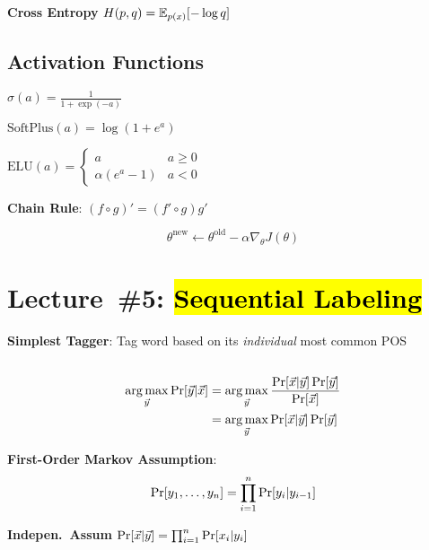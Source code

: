 \documentclass[8pt]{extarticle}
\renewcommand{\green}[1]{{\color{ForestGreen} #1}}
\newcommand{\greenbf}[1]{\textbf{\green{#1}}}
\begin{document}
\begin{multicols}{3}
  \greenbf{Cross Entropy} $H(p,q) = \mathbb{E}_{p(x)} \lbrack-\log q\rbrack$

  \subsection*{Activation Functions}

  $\sigma(a) = \frac{1}{1+\exp(-a)}$

  $\text{SoftPlus}(a) = \log(1 + e^{a})$

  $\text{ELU}(a) = \begin{cases}
                      a & a \geq 0 \\
                      \alpha (e^{a} - 1) & a < 0
                   \end{cases}$

  \greenbf{Chain Rule}: $(f \circ g)' = (f' \circ g)g'$

  \begin{equation*}
    \theta^{\text{new}} \gets \theta^{\text{old}} - \alpha \nabla_{\theta}J(\theta)
  \end{equation*}

  \section*{Lecture~\#5: \hl{Sequential Labeling}}

  \textbf{Simplest Tagger}: Tag word based on its \textit{individual} most common POS

  \subsection*{}

  \begin{align*}
    \operatorname*{arg\,max}_{\vec{y}} \Pr\lbrack\vec{y} \vert \vec{x}\rbrack &= \operatorname*{arg\,max}_{\vec{y}} \frac{\Pr\lbrack\vec{x} \vert \vec{y}\rbrack\Pr[\vec{y}]}{\Pr[\vec{x}]} \\
                                                        &= \operatorname*{arg\,max}_{\vec{y}} \Pr\lbrack\vec{x} \vert \vec{y}\rbrack \Pr[\vec{y}]
  \end{align*}

  \greenbf{First-Order Markov Assumption}:
  \begin{equation*}
    \Pr\lbrack y_{1},\ldots,y_{n}\rbrack = \prod_{i=1}^{n} \Pr[y_{i} \vert y_{i-1}]
  \end{equation*}

  \greenbf{Indepen.\ Assum} $\Pr\lbrack\vec{x} \vert \vec{y}\rbrack = \prod_{i=1}^{n} \Pr[x_{i} \vert y_{i}]$


\end{multicols}
\end{document}
